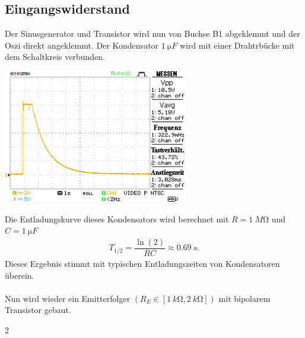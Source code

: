 \documentclass[10pt]{article}
\newenvironment{Figure}
  {\par\medskip\noindent\minipage{\linewidth}}
  {\endminipage\par\medskip}
\begin{document}
\begin{multicols}{2}
        \subsection{Eingangswiderstand}
        Der Sinusgenerator und Transistor wird nun von Buchse B1 abgeklemmt und der Oszi direkt angeklemmt.
        Der Kondensator $\SI{1}{\micro F}$ wird mit einer Drahtrbücke mit dem Schaltkreis verbunden.
        \begin{Figure}
                \centering
                \includegraphics[width=0.6\textwidth]{data/DS0015.png}
        \end{Figure}
        Die Entladungskurve dieses Kondensators wird berechnet mit $R=\SI{1}{M\ohm}$ und $C=\SI{1}{\micro F}$ 
        \begin{align} 
                T_{1/2}=\dfrac{\ln\left(2\right)}{RC}\approx \SI{0.69}{s}
        .\end{align} 
        Dieses Ergebnis stimmt mit typischen Entladungszeiten von Kondensatoren überein.\\\\
        Nun wird wieder ein Emitterfolger $\left(R_E \in \left[\SI{1}{k\ohm},\SI{2}{k\ohm}\right]\right)$ mit bipolarem Transistor gebaut.
        
\end{multicols}{2}
\clearpage
\listoffigures
\listoftables



\end{document}
